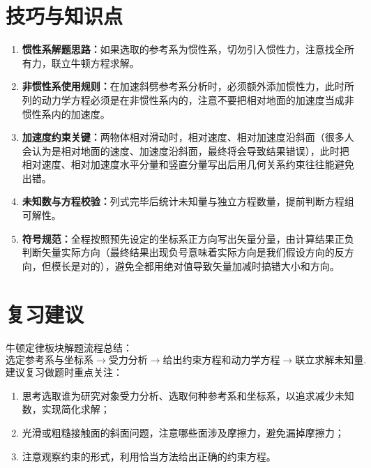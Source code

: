\documentclass[11pt,a4paper]{ctexart}
\begin{document}
\section*{技巧与知识点}
\begin{tipBox}
\begin{enumerate}
  \item \textbf{惯性系解题思路：}如果选取的参考系为惯性系，切勿引入惯性力，注意找全所有力，联立牛顿方程求解。
  \item \textbf{非惯性系使用规则：}在加速斜劈参考系分析时，必须额外添加惯性力，此时所列的动力学方程必须是在非惯性系内的，注意不要把相对地面的加速度当成非惯性系内的加速度。
  \item \textbf{加速度约束关键：}两物体相对滑动时，相对速度、相对加速度沿斜面（很多人会认为是相对地面的速度、加速度沿斜面，最终将会导致结果错误），此时把相对速度、相对加速度水平分量和竖直分量写出后用几何关系约束往往能避免出错。
  \item \textbf{未知数与方程校验：}列式完毕后统计未知量与独立方程数量，提前判断方程组可解性。
  \item \textbf{符号规范：}全程按照预先设定的坐标系正方向写出矢量分量，由计算结果正负判断矢量实际方向（最终结果出现负号意味着实际方向是我们假设方向的反方向，但模长是对的），避免全都用绝对值导致矢量加减时搞错大小和方向。
\end{enumerate}
\end{tipBox}

\section*{复习建议}
牛顿定律板块解题流程总结：
\[
\text{选定参考系与坐标系}
\longrightarrow
\text{受力分析}
\longrightarrow
\text{给出约束方程和动力学方程}
\longrightarrow
\text{联立求解未知量}.
\]
建议复习做题时重点关注：
\begin{enumerate}
  \item 思考选取谁为研究对象受力分析、选取何种参考系和坐标系，以追求减少未知数，实现简化求解；
  \item 光滑或粗糙接触面的斜面问题，注意哪些面涉及摩擦力，避免漏掉摩擦力；
  \item 注意观察约束的形式，利用恰当方法给出正确的约束方程。
\end{enumerate}
\end{document}
